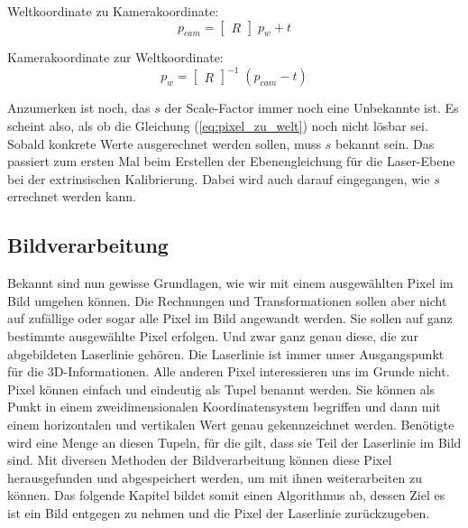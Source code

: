 	Weltkoordinate zu Kamerakoordinate:
	\begin{equation}
	p_{cam} = \begin{bmatrix} R \end{bmatrix} \; p_w + t
	\label{eq:welt_zu_kamera}
	\end{equation}
	
	Kamerakoordinate zur Weltkoordinate:
	\begin{equation}
	p_w = \begin{bmatrix} R \end{bmatrix}^{-1} \; (p_{cam} - t)
	\label{eq:kamera_zu_welt}
	\end{equation}
	
	Anzumerken ist noch, das \( s \) der Scale-Factor immer noch eine Unbekannte ist. Es scheint also, als ob die Gleichung (\ref{eq:pixel_zu_welt}) noch nicht lösbar sei. Sobald konkrete Werte ausgerechnet werden sollen, muss \( s \) bekannt sein. Das passiert zum ersten Mal beim Erstellen der Ebenengleichung für die Laser-Ebene bei der extrinsischen Kalibrierung. Dabei wird auch darauf eingegangen, wie \( s \) errechnet werden kann.  
	
	\newpage
	
	\label{chap:transformationen}
	\subsection{Bildverarbeitung}
	Bekannt sind nun gewisse Grundlagen, wie wir mit einem ausgewählten Pixel im Bild umgehen können. Die Rechnungen und Transformationen sollen aber nicht auf zufällige oder sogar alle Pixel im Bild angewandt werden. Sie sollen auf ganz bestimmte ausgewählte Pixel erfolgen. Und zwar ganz genau diese, die zur abgebildeten Laserlinie gehören. Die Laserlinie ist immer unser Ausgangspunkt für die 3D-Informationen. Alle anderen Pixel interessieren uns im Grunde nicht. \newline
	Pixel können einfach und eindeutig als Tupel benannt werden. Sie können als Punkt in einem zweidimensionalen Koordinatensystem begriffen und dann mit einem horizontalen und vertikalen Wert genau gekennzeichnet werden. Benötigte wird eine Menge an diesen Tupeln, für die gilt, dass sie Teil der Laserlinie im Bild sind. Mit diversen Methoden der Bildverarbeitung können diese Pixel herausgefunden und abgespeichert werden, um mit ihnen weiterarbeiten zu können. Das folgende Kapitel bildet somit einen Algorithmus ab, dessen Ziel es ist ein Bild entgegen zu nehmen und die Pixel der Laserlinie zurückzugeben. 
	
